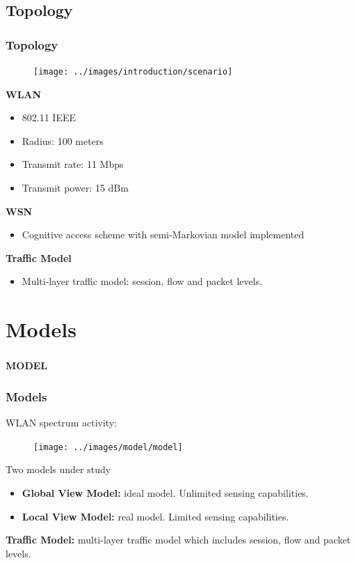 \documentclass[9pt,handout,serif]{beamer}
\begin{document}
\subsection{Topology}
\begin{frame}[c]
	\frametitle{Topology}
	\begin{figure}
		\texttt{[image: ../images/introduction/scenario]}
	\end{figure}
	\textbf{WLAN}\\
	\begin{itemize}
		\item 802.11 IEEE
		\item Radius: 100 meters
		\item Transmit rate: 11 Mbps
		\item Transmit power: 15 dBm
	\end{itemize}
	\textbf{WSN}\\
	\begin{itemize}
		\item Cognitive access scheme with semi-Markovian model implemented
	\end{itemize}
	\textbf{Traffic Model}
	\begin{itemize}
		\item Multi-layer traffic model: session, flow and packet levels.
	\end{itemize}
\end{frame}

\section{Models}
\begin{frame}[c]
	\frametitle{}
	\begin{center}
		\textbf{\Huge{MODEL}}
	\end{center}
\end{frame}

\begin{frame}[c]
	\frametitle{Models}
	WLAN spectrum activity:
	\begin{figure}
		\texttt{[image: ../images/model/model]}
	\end{figure}
	
	Two models under study
	\begin{itemize}
		\item \textbf{Global View Model:} ideal model. Unlimited sensing capabilities.
		\item \textbf{Local View Model:} real model. Limited sensing capabilities.
	\end{itemize}
	\textbf{Traffic Model:} multi-layer traffic model which includes session, flow and packet levels.
\end{frame}
\end{document}

